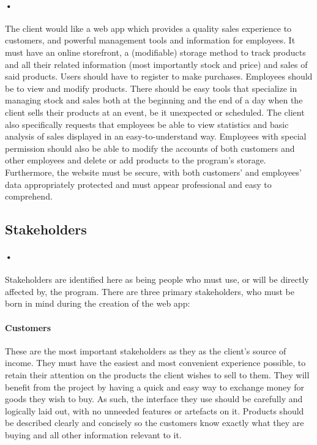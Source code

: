 ﻿\documentclass{article}
\begin{document}
    \paragraph{•}
    The client would like a web app which provides a quality sales experience to customers, and powerful management tools and information for employees. 
    It must have an online storefront, a (modifiable) storage method to track products and all their related information (most importantly stock and price) and sales of said products. 
    Users should have to register to make purchases. 
    Employees should be to view and modify products. 
    There should be easy tools that specialize in managing stock and sales both at the beginning and the end of a day when the client sells their products at an event, be it unexpected or scheduled. 
    The client also specifically requests that employees be able to view statistics and basic analysis of sales displayed in an easy-to-understand way. 
    Employees with special permission should also be able to modify the accounts of both customers and other employees and delete or add products to the program’s storage. 
    Furthermore, the website must be secure, with both customers’ and employees’ data appropriately protected and must appear professional and easy to comprehend.
    
    \subsection{Stakeholders}
    \paragraph{•}
    Stakeholders are identified here as being people who must use, or will be directly affected by, the program. 
    There are three primary stakeholders, who must be born in mind during the creation of the web app:
    \paragraph{Customers}
    These are the most important stakeholders as they as the client’s source of income. 
    They must have the easiest and most convenient experience possible, to retain their attention on the products the client wishes to sell to them. 
    They will benefit from the project by having a quick and easy way to exchange money for goods they wish to buy. 
    As such, the interface they use should be carefully and logically laid out, with no unneeded features or artefacts on it. 
    Products should be described clearly and concisely so the customers know exactly what they are buying and all other information relevant to it.
\end{document}

